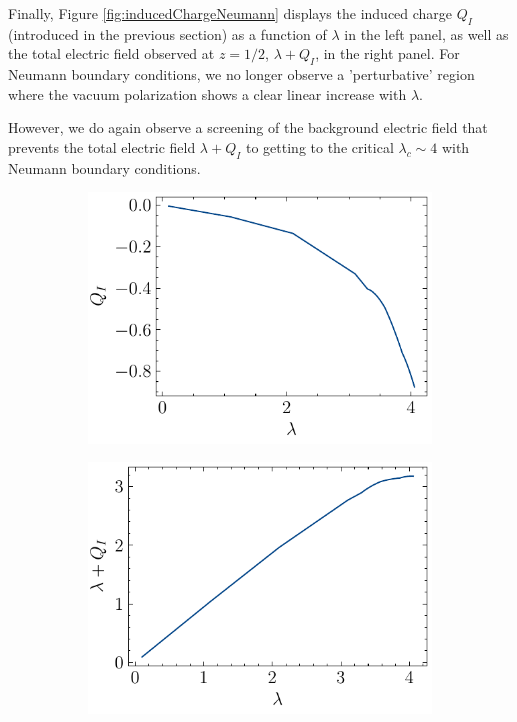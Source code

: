 Finally, Figure \ref{fig:inducedChargeNeumann} displays the induced charge $Q_I$ (introduced in the previous section) as a function of $\lambda$ in the left panel, as well as the total electric field observed at $z=1/2$,  $\lambda + Q_I$, in the right panel. For Neumann boundary conditions, we no longer observe a 'perturbative' region where the vacuum polarization shows a clear linear increase with $\lambda$.

However, we do again observe a screening of the background electric field that prevents the total electric field $\lambda+Q_I$ to getting to the critical $\lambda_c \sim 4$ with Neumann boundary conditions.

\begin{figure}
 \begin{subfigure}{0.5\textwidth}
    \centering
    \includegraphics[width=\linewidth]{figures/neumann/inducedCharge.pdf}
 \end{subfigure}
 \begin{subfigure}{0.5\textwidth}
    \centering
    \includegraphics[width=\linewidth]{figures/neumann/electricFieldInduced.pdf}

\end{subfigure}
\end{figure}

